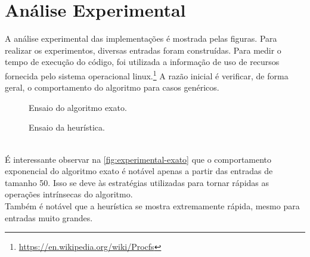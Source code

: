 \documentclass{article}
\begin{document}
\section{Análise Experimental}
A análise experimental das implementações é mostrada pelas figuras. Para realizar os experimentos, diversas entradas foram construídas. Para medir o tempo de execução do código, foi utilizada a informação de uso de recursos fornecida pelo sistema operacional linux.\footnote{\url{https://en.wikipedia.org/wiki/Procfs}} A razão inicial é verificar, de forma geral, o comportamento do algoritmo para casos genéricos.
\begin{figure}[h]
  \centering
  
  
  \caption{Ensaio do algoritmo exato.}
  \label{fig:experimental-exato}
\end{figure}
\vspace{-10pt}
\begin{figure}[h]
  \centering
  
  
  \caption{Ensaio da heurística.}
\end{figure} \\
É interessante observar na \autoref{fig:experimental-exato} que o comportamento exponencial do algoritmo exato é notável apenas a partir das entradas de tamanho 50. Isso se deve às estratégias utilizadas para tornar rápidas as operações intrínsecas do algoritmo.
\\[5pt]
Também é notável que a heurística se mostra extremamente rápida, mesmo para entradas muito grandes.


\pagebreak
\end{document}
